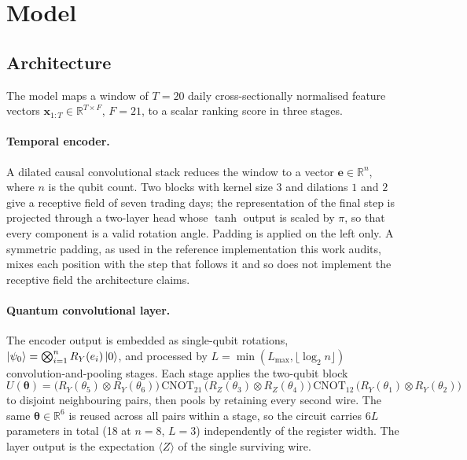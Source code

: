 \section{Model}
\label{sec:method}

\subsection{Architecture}
\label{sec:method:arch}
The model maps a window of $T=20$ daily cross-sectionally normalised feature
vectors $\mathbf{x}_{1:T} \in \mathbb{R}^{T \times F}$, $F=21$, to a scalar
ranking score in three stages.

\paragraph{Temporal encoder.}
A dilated causal convolutional stack reduces the window to a vector
$\mathbf{e} \in \mathbb{R}^{n}$, where $n$ is the qubit count. Two blocks with
kernel size 3 and dilations $1$ and $2$ give a receptive field of seven trading
days; the representation of the final step is projected through a two-layer
head whose $\tanh$ output is scaled by $\pi$, so that every component is a valid
rotation angle. Padding is applied on the left only. A symmetric padding, as
used in the reference implementation this work audits, mixes each position with
the step that follows it and so does not implement the receptive field the
architecture claims.

\paragraph{Quantum convolutional layer.}
The encoder output is embedded as single-qubit rotations,
$\left|\psi_0\right\rangle = \bigotimes_{i=1}^{n} R_Y(e_i)\left|0\right\rangle$, and processed by
$L = \min(L_{\max}, \lfloor \log_2 n \rfloor)$ convolution-and-pooling stages.
Each stage applies the two-qubit block
\begin{equation}
  U(\boldsymbol{\theta}) =
  \bigl(R_Y(\theta_5) \otimes R_Y(\theta_6)\bigr)\,
  \mathrm{CNOT}_{21}\,
  \bigl(R_Z(\theta_3) \otimes R_Z(\theta_4)\bigr)\,
  \mathrm{CNOT}_{12}\,
  \bigl(R_Y(\theta_1) \otimes R_Y(\theta_2)\bigr)
\end{equation}
to disjoint neighbouring pairs, then pools by retaining every second wire. The
same $\boldsymbol{\theta} \in \mathbb{R}^{6}$ is reused across all pairs within
a stage, so the circuit carries $6L$ parameters in total (18 at $n=8$,
$L=3$) independently of the register width. The layer output is the
expectation $\langle Z \rangle$ of the single surviving wire.

